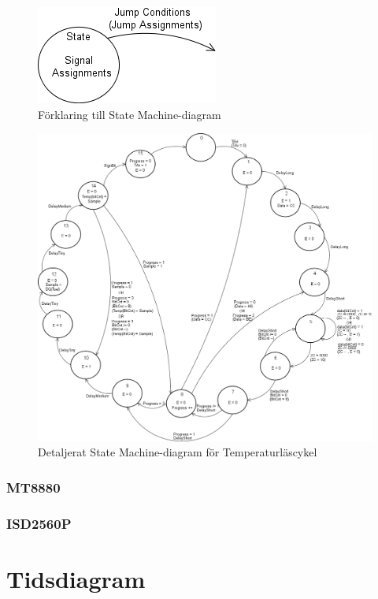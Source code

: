 \documentclass[a4paper,11pt]{article}
\begin{document}
	\begin{figure}[h!tb]
	  \centering
	      \includegraphics[scale=0.5, angle=0]{StateMachineExplained.png}
	  	\caption{Förklaring till State Machine-diagram}
	\end{figure}

	\begin{figure}[h!tb]
	  \centering
	      \includegraphics[scale=0.4, angle=0]{TempStateMachineDiagram.png}
	  	\caption{Detaljerat State Machine-diagram för Temperaturläscykel}
	\end{figure}

		\subsubsection{MT8880}
		\subsubsection{ISD2560P}

\section{Tidsdiagram}
\end{document}
